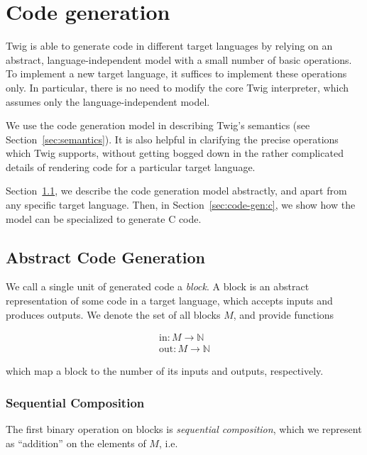 
\section{Code generation}
\label{sec:code-gen}

Twig is able to generate code in different target languages by
relying on an abstract, language-independent model with a small
number of basic operations. To implement a new target language, it
suffices to implement these operations only. In particular, there
is no need to modify the core Twig interpreter, which assumes only
the language-independent model.

We use the code generation model in describing Twig's semantics
(see Section~\ref{sec:semantics}). It is also helpful in
clarifying the precise operations which Twig supports, without
getting bogged down in the rather complicated details of rendering
code for a particular target language.

Section~\ref{sec:code-gen:abstract}, we describe the code
generation model abstractly, and apart from any specific target
language. Then, in Section~\ref{sec:code-gen:c}, we show how the
model can be specialized to generate C code.

\subsection{Abstract Code Generation}
\label{sec:code-gen:abstract}

We call a single unit of generated code a \emph{block}. A block is
an abstract representation of some code in a target language,
which accepts inputs and produces outputs. We denote the 
set of all blocks $M$, and provide functions 

\begin{eqnarray*}
\mbox{in} : M \to \mathbb{N}\\
\mbox{out} : M \to \mathbb{N}
\end{eqnarray*}

which map a block to the number of its inputs and outputs,
respectively.

\subsubsection{Sequential Composition}

The first binary operation on blocks is \emph{sequential
composition}, which we represent as ``addition'' on the elements
of $M$, i.e.

